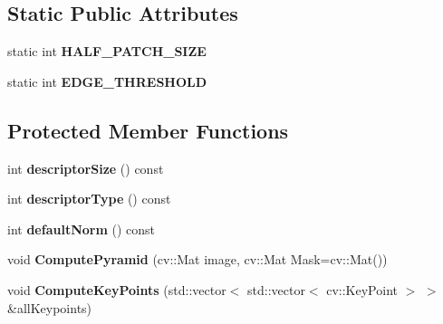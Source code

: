 \subsection*{Static Public Attributes}
\begin{DoxyCompactItemize}
\item 
static int {\bfseries H\+A\+L\+F\+\_\+\+P\+A\+T\+C\+H\+\_\+\+S\+I\+ZE}\hypertarget{classmdBRIEFextractor_aa4ff165effca9090aafbcc78172571bd}{}\label{classmdBRIEFextractor_aa4ff165effca9090aafbcc78172571bd}

\item 
static int {\bfseries E\+D\+G\+E\+\_\+\+T\+H\+R\+E\+S\+H\+O\+LD}\hypertarget{classmdBRIEFextractor_acca8f6f32082195ccb23acb6616cb67e}{}\label{classmdBRIEFextractor_acca8f6f32082195ccb23acb6616cb67e}

\end{DoxyCompactItemize}
\subsection*{Protected Member Functions}
\begin{DoxyCompactItemize}
\item 
int {\bfseries descriptor\+Size} () const \hypertarget{classmdBRIEFextractor_a9de61227e11bd3a79339197e7d68071c}{}\label{classmdBRIEFextractor_a9de61227e11bd3a79339197e7d68071c}

\item 
int {\bfseries descriptor\+Type} () const \hypertarget{classmdBRIEFextractor_adf35fa5de268c265694a3bfb1b1de41b}{}\label{classmdBRIEFextractor_adf35fa5de268c265694a3bfb1b1de41b}

\item 
int {\bfseries default\+Norm} () const \hypertarget{classmdBRIEFextractor_abbbcf3ddb0a8a9cf2e907495fb2dc688}{}\label{classmdBRIEFextractor_abbbcf3ddb0a8a9cf2e907495fb2dc688}

\item 
void {\bfseries Compute\+Pyramid} (cv\+::\+Mat image, cv\+::\+Mat Mask=cv\+::\+Mat())\hypertarget{classmdBRIEFextractor_a343fc2937c41686f0794c30b0d57e594}{}\label{classmdBRIEFextractor_a343fc2937c41686f0794c30b0d57e594}

\item 
void {\bfseries Compute\+Key\+Points} (std\+::vector$<$ std\+::vector$<$ cv\+::\+Key\+Point $>$ $>$ \&all\+Keypoints)\hypertarget{classmdBRIEFextractor_a286c01b9ff8c90f4ff3d704b66635f6a}{}\label{classmdBRIEFextractor_a286c01b9ff8c90f4ff3d704b66635f6a}

\end{DoxyCompactItemize}
